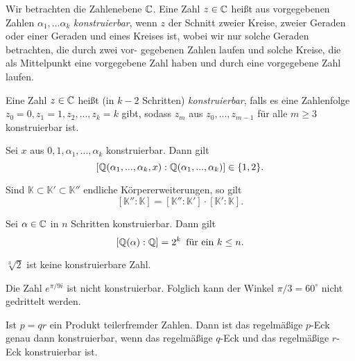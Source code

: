 \documentclass{cheat-sheet}
\newcommand{\K}{\mathbb{K}} %
\begin{document}

\begin{defn}
  Wir betrachten die Zahlenebene $\mathbb{C}$. Eine Zahl $z \in \mathbb{C}$ heißt aus vorgegebenen Zahlen $\alpha_1, ... \alpha_k$ \emph{konstruierbar}, wenn $z$ der Schnitt zweier Kreise, zweier Geraden oder einer Geraden und eines Kreises ist, wobei wir nur solche Geraden betrachten, die durch zwei vor- gegebenen Zahlen laufen und solche Kreise, die als Mittelpunkt eine vorgegebene Zahl haben und durch eine vorgegebene Zahl laufen.
\end{defn}

\begin{defn}
  Eine Zahl $z \in \mathbb{C}$ heißt (in $k-2$ Schritten) \emph{konstruierbar}, falls es eine Zahlenfolge $z_0 = 0, z_1 = 1, z_2, ..., z_k = k$ gibt, sodass $z_m$ aus $z_0, ..., z_{m-1}$ für alle $m \geq 3$ konstruierbar ist.
\end{defn}

\begin{defn}
  Sei $x$ aus $0, 1, \alpha_1, ..., \alpha_k$ konstruierbar. Dann gilt
  \[ [ \mathbb{Q}(\alpha_1, ..., \alpha_k, x) : \mathbb{Q}(\alpha_1, ..., \alpha_k) ] \in \{ 1, 2 \}. \]
\end{defn}

\begin{lem}
  Sind $\K \subset \K' \subset \K''$ endliche Körpererweiterungen, so gilt
  \[ [ \K'' : \K ] = [ \K'' : \K' ] \cdot [ \K' : \K ]. \]
\end{lem}

\begin{satz}
  Sei $\alpha \in \mathbb{C}$ in $n$ Schritten konstruierbar. Dann gilt
  \[
    [ \mathbb{Q}(\alpha) : \mathbb{Q} ] = 2^k
    \enspace \text{für ein } k \leq n.
  \]
\end{satz}


\begin{satz}
  $\sqrt[3]{2}$ ist keine konstruierbare Zahl.
\end{satz}

\begin{satz}
  Die Zahl $e^{\pi/9 i}$ ist nicht konstruierbar. Folglich kann der Winkel $\pi / 3 = 60^{\circ}$ nicht gedrittelt werden.
\end{satz}


\begin{lem}
  Ist $p = qr$ ein Produkt teilerfremder Zahlen. Dann ist das regelmäßige $p$-Eck genau dann konstruierbar, wenn das regelmäßige $q$-Eck und das regelmäßige $r$-Eck konstruierbar ist.
\end{lem}
\end{document}
